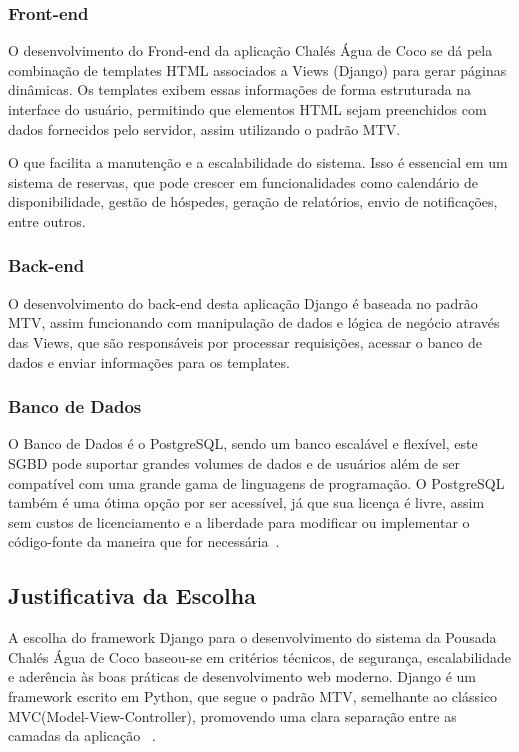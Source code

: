 \documentclass[
	12pt,				%
	openany,			%
	oneside,			%
	a4paper,			%
	english,			%
	french,				%
	spanish,			%
	brazil				%
	]{abntex2}
\begin{document}
\subsubsection{Front-end}

O desenvolvimento do Frond-end da aplicação Chalés Água de Coco se dá pela combinação de templates HTML associados a Views (Django) para gerar páginas dinâmicas. Os templates exibem essas informações de forma estruturada na interface do usuário, permitindo que elementos HTML sejam preenchidos com dados fornecidos pelo servidor, assim utilizando o padrão MTV.

O que facilita a manutenção e a escalabilidade do sistema. Isso é essencial em um sistema de reservas, que pode crescer em funcionalidades como calendário de disponibilidade, gestão de hóspedes, geração de relatórios, envio de notificações, entre outros.

\subsubsection{Back-end}

O desenvolvimento do back-end desta aplicação Django é baseada no padrão MTV, assim funcionando com manipulação de dados e lógica de negócio através das Views, que são responsáveis por processar requisições, acessar o banco de dados e enviar informações para os templates.

\subsubsection{Banco de Dados}

O Banco de Dados é o PostgreSQL, sendo um banco escalável e flexível, este SGBD pode suportar grandes volumes de dados e de usuários além de ser compatível com uma grande gama de linguagens de programação.
O PostgreSQL também é uma ótima opção por ser acessível, já que sua licença é livre, assim sem custos de licenciamento e a liberdade para modificar ou implementar o código-fonte da maneira que for necessária~\cite{postgresql}.

\subsection{Justificativa da Escolha}

A escolha do framework Django para o desenvolvimento do sistema da Pousada Chalés Água de Coco baseou-se em critérios técnicos, de segurança, escalabilidade e aderência às boas práticas de desenvolvimento web moderno. Django é um framework escrito em Python, que segue o padrão MTV, semelhante ao clássico MVC(Model-View-Controller), promovendo uma clara separação entre as camadas da aplicação ~\cite{python}.
\end{document}
